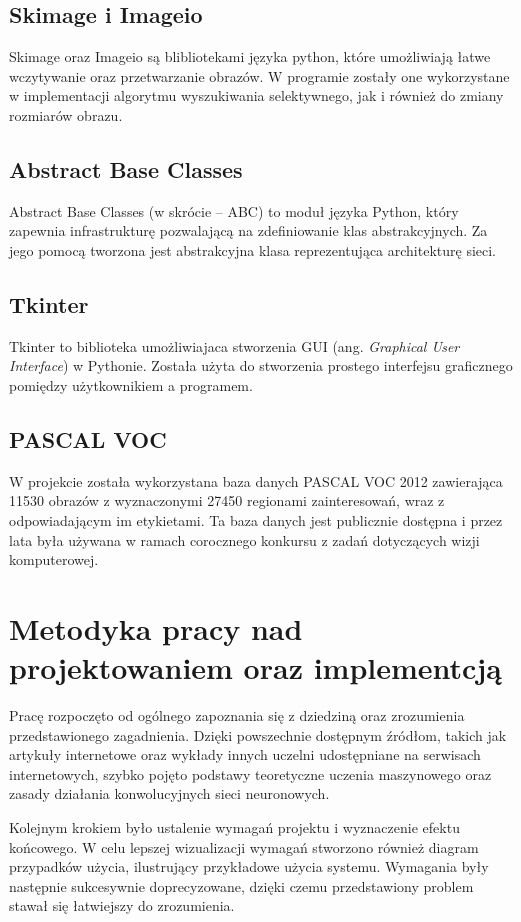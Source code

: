\documentclass[a4paper,twoside,12pt]{book}
\newcommand{\obcy}[1]{\emph{#1}}
\newcommand{\ang}[1]{{\selectlanguage{british}\obcy{#1}}}
\begin{document}
{\subsection{Skimage i Imageio}
{Skimage oraz Imageio są blibliotekami języka python, które umożliwiają łatwe wczytywanie oraz przetwarzanie obrazów. W programie zostały one wykorzystane w implementacji algorytmu wyszukiwania selektywnego, jak i również do zmiany rozmiarów obrazu.}
\subsection{Abstract Base Classes}
\label{abc}
{Abstract Base Classes (w skrócie – ABC) to moduł języka Python, który zapewnia infrastrukturę pozwalającą na zdefiniowanie klas abstrakcyjnych. Za jego pomocą tworzona jest abstrakcyjna klasa reprezentująca architekturę sieci. }
\subsection{Tkinter}
{Tkinter to biblioteka umożliwiajaca stworzenia GUI (ang. \ang{Graphical User Interface}) w Pythonie. Została użyta do stworzenia prostego interfejsu graficznego pomiędzy użytkownikiem a programem.}
\subsection{PASCAL VOC}
{W projekcie została wykorzystana baza danych PASCAL VOC 2012\cite{PASCAL} zawierająca 11530 obrazów z wyznaczonymi 27450 regionami zainteresowań, wraz z odpowiadającym im etykietami. Ta baza danych jest publicznie dostępna i przez lata była używana w ramach corocznego konkursu z zadań dotyczących wizji komputerowej.
}

\section{Metodyka pracy nad projektowaniem oraz implementcją}
{Pracę rozpoczęto od ogólnego zapoznania się z dziedziną oraz zrozumienia przedstawionego zagadnienia. Dzięki powszechnie dostępnym źródłom, takich jak artykuły internetowe oraz wykłady innych uczelni udostępniane na serwisach internetowych, szybko pojęto podstawy teoretyczne uczenia maszynowego oraz zasady działania konwolucyjnych sieci neuronowych.}

{Kolejnym krokiem było ustalenie wymagań projektu i wyznaczenie efektu końcowego. W celu lepszej wizualizacji wymagań stworzono również diagram przypadków użycia, ilustrujący przykładowe użycia systemu. Wymagania były następnie sukcesywnie  doprecyzowane, dzięki czemu przedstawiony problem stawał się łatwiejszy do zrozumienia.}

}
\end{document}
